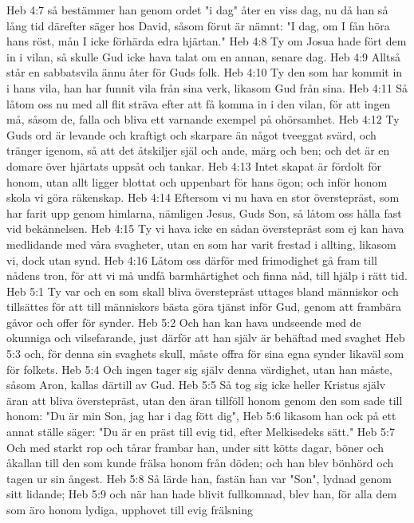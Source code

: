 Heb 4:7  så bestämmer han genom ordet "i dag" åter en viss dag, nu då han så lång tid därefter säger hos David, såsom förut är nämnt: "I dag, om I fån höra hans röst, mån I icke förhärda edra hjärtan."
Heb 4:8  Ty om Josua hade fört dem in i vilan, så skulle Gud icke hava talat om en annan, senare dag.
Heb 4:9  Alltså står en sabbatsvila ännu åter för Guds folk.
Heb 4:10  Ty den som har kommit in i hans vila, han har funnit vila från sina verk, likasom Gud från sina.
Heb 4:11  Så låtom oss nu med all flit sträva efter att få komma in i den vilan, för att ingen må, såsom de, falla och bliva ett varnande exempel på ohörsamhet.
Heb 4:12  Ty Guds ord är levande och kraftigt och skarpare än något tveeggat svärd, och tränger igenom, så att det åtskiljer själ och ande, märg och ben; och det är en domare över hjärtats uppsåt och tankar.
Heb 4:13  Intet skapat är fördolt för honom, utan allt ligger blottat och uppenbart för hans ögon; och inför honom skola vi göra räkenskap.
Heb 4:14  Eftersom vi nu hava en stor överstepräst, som har farit upp genom himlarna, nämligen Jesus, Guds Son, så låtom oss hålla fast vid bekännelsen.
Heb 4:15  Ty vi hava icke en sådan överstepräst som ej kan hava medlidande med våra svagheter, utan en som har varit frestad i allting, likasom vi, dock utan synd.
Heb 4:16  Låtom oss därför med frimodighet gå fram till nådens tron, för att vi må undfå barmhärtighet och finna nåd, till hjälp i rätt tid.
Heb 5:1  Ty var och en som skall bliva överstepräst uttages bland människor och tillsättes för att till människors bästa göra tjänst inför Gud, genom att frambära gåvor och offer för synder.
Heb 5:2  Och han kan hava undseende med de okunniga och vilsefarande, just därför att han själv är behäftad med svaghet
Heb 5:3  och, för denna sin svaghets skull, måste offra för sina egna synder likaväl som för folkets.
Heb 5:4  Och ingen tager sig själv denna värdighet, utan han måste, såsom Aron, kallas därtill av Gud.
Heb 5:5  Så tog sig icke heller Kristus själv äran att bliva överstepräst, utan den äran tillföll honom genom den som sade till honom: "Du är min Son, jag har i dag fött dig",
Heb 5:6  likasom han ock på ett annat ställe säger: "Du är en präst till evig tid, efter Melkisedeks sätt."
Heb 5:7  Och med starkt rop och tårar frambar han, under sitt kötts dagar, böner och åkallan till den som kunde frälsa honom från döden; och han blev bönhörd och tagen ur sin ångest.
Heb 5:8  Så lärde han, fastän han var "Son", lydnad genom sitt lidande;
Heb 5:9  och när han hade blivit fullkomnad, blev han, för alla dem som äro honom lydiga, upphovet till evig frälsning
